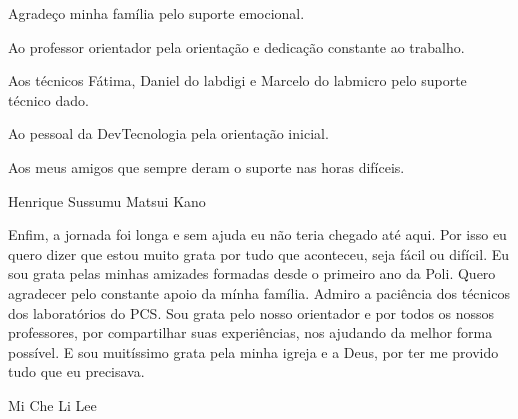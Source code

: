 \begin{agradecimentos}
\vspace{10mm}
Agradeço minha família pelo suporte emocional.

Ao professor orientador pela orientação e dedicação constante ao trabalho.

Aos técnicos Fátima, Daniel do labdigi e Marcelo do labmicro pelo suporte técnico dado.

Ao pessoal da DevTecnologia pela orientação inicial.

Aos meus amigos que sempre deram o suporte nas horas difíceis.

\vspace{10mm}
Henrique Sussumu Matsui Kano
\vspace{40mm}

Enfim, a jornada foi longa e sem ajuda eu não teria chegado até aqui. Por isso eu quero dizer que estou muito grata por tudo que aconteceu, seja fácil ou difícil. Eu sou grata pelas minhas amizades formadas desde o primeiro ano da Poli. Quero agradecer pelo constante apoio da mínha família. Admiro a paciência dos técnicos dos laboratórios do PCS. Sou grata pelo nosso orientador e por todos os nossos professores, por compartilhar suas experiências, nos ajudando da melhor forma possível. E sou muitíssimo grata pela minha igreja e a Deus, por ter me provido tudo que eu precisava.

\vspace{10mm}
Mi Che Li Lee
\hfill
\end{agradecimentos}
